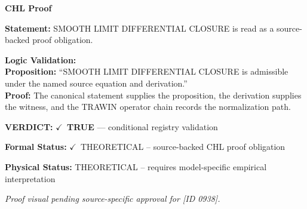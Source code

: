 \vspace{0.45em}
\noindent\textbf{CHL Proof}\par
\textbf{Statement:} SMOOTH LIMIT DIFFERENTIAL CLOSURE is read as a source-backed proof obligation.

\textbf{Logic Validation:}\\
\textbf{Proposition:} ``SMOOTH LIMIT DIFFERENTIAL CLOSURE is admissible under the named source equation and derivation.''\\
\textbf{Proof:} The canonical statement supplies the proposition, the derivation supplies the witness, and the TRAWIN operator chain records the normalization path.

\textbf{VERDICT:} \ensuremath{\checkmark}\ \textbf{TRUE} --- conditional registry validation

\textbf{Formal Status:} \ensuremath{\checkmark}\ THEORETICAL -- source-backed CHL proof obligation

\textbf{Physical Status:} THEORETICAL -- requires model-specific empirical interpretation
\par\vspace{0.45em}
\par
\vfill
\begingroup\footnotesize\itshape
Proof visual pending source-specific approval for [ID 0938].
\par\endgroup
\vfill
\endgroup
\endgroup
